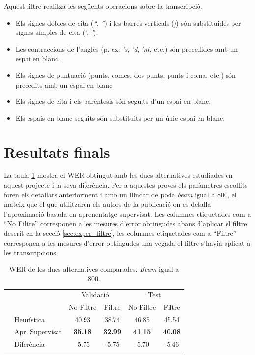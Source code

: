 Aquest filtre realitza les següents operacions sobre la transcripció.
\begin{itemize}
\item Els signes dobles de cita (\emph{``}, \emph{''}) i les barres verticals (\emph{|}) són substituides per signes simples de cita (\emph{`}, \emph{'}).
\item Les contraccions de l'anglès (p. ex: \emph{'s}, \emph{'d}, \emph{'nt}, etc.) són precedides amb un espai en blanc.
\item Els signes de puntuació (punts, comes, dos punts, punts i coma, etc.) són precedits amb un espai en blanc.
\item Els signes de cita i els parèntesis són seguits d'un espai en blanc.
\item Els espais en blanc seguits són substituits per un únic espai en blanc.
\end{itemize}

\section{Resultats finals}
La taula \ref{tab:comp_prhlt_elirf} mostra el WER obtingut amb les dues alternatives estudiades en aquest projecte i la seva diferència. Per a aquestes proves els paràmetres escollits foren els detallats anteriorment i amb un llindar de poda \emph{beam} igual a 800, el mateix que el que utilitzaren els autors de la publicació on es detalla \mbox{l'aproximació} basada en aprenentatge supervisat. Les columnes etiquetades com a ``No Filtre'' corresponen a les mesures d'error obtingudes abans d'aplicar el filtre descrit en la secció \ref{sec:exper_filtre}, les columnes etiquetades com a ``Filtre'' corresponen a les mesures d'error obtingudes una vegada el filtre s'havia aplicat a les transcripcions.\\

\begin{table}
\begin{center}
\begin{tabular}{ll|c|c|c|c|}
\cline{3-6} & & \multicolumn{2}{c|}{Validació} & \multicolumn{2}{c|}{Test}\\
\cline{3-6} & & No Filtre & Filtre & No Filtre & Filtre\\
\cline{1-6} \multicolumn{1}{|l}{} & Heurística & 40.93 & 38.74 & 46.85 & 45.54\\ 
\cline{1-6} \multicolumn{1}{|l}{} & Apr. Supervisat & \textbf{35.18} & \textbf{32.99} & \textbf{41.15} & \textbf{40.08}\\ 
\cline{1-6} \multicolumn{1}{|l}{} & Diferència & -5.75 & -5.75 & -5.70 & -5.46 \\ 
\hline 
\end{tabular} 
\caption{WER de les dues alternatives comparades. \emph{Beam} igual a 800.}\label{tab:comp_prhlt_elirf}
\end{center}
\end{table}

